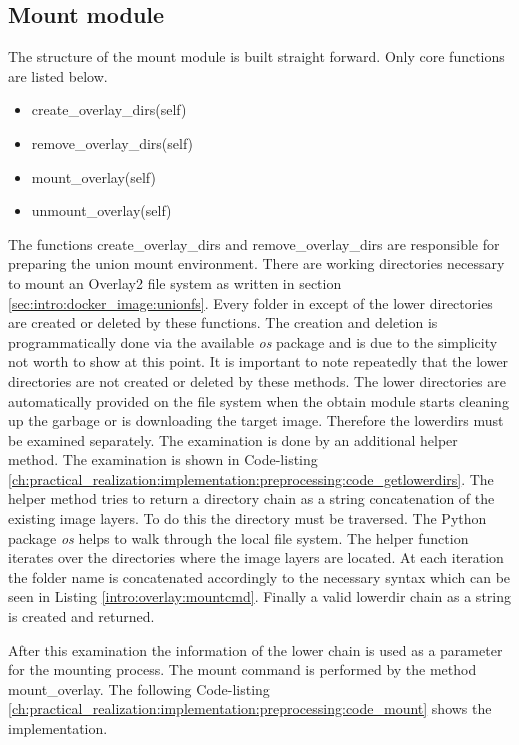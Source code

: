 \subsection{Mount module}	
\label{ch:practical_realization:implementation:mount}
The structure of the mount module is built straight forward. Only core functions are listed below.
\begin{itemize}
\item create\_overlay\_dirs(self)
\item remove\_overlay\_dirs(self)
\item mount\_overlay(self)
\item unmount\_overlay(self)
\end{itemize}
The functions create\_overlay\_dirs and remove\_overlay\_dirs are responsible for preparing the union mount environment. 
There are working directories necessary to mount an Overlay2 file system as written in section \ref{sec:intro:docker_image:unionfs}.
Every folder in except of the lower directories are created or deleted by these functions. 
The creation and deletion is programmatically done via the available \textit{os} package and is due to the simplicity not worth to show at this point. 
It is important to note repeatedly that the lower directories are not created or deleted by these methods. 
The lower directories are automatically provided on the file system when the obtain module starts cleaning up the garbage or is downloading the target image.
Therefore the lowerdirs must be examined separately. The examination is done by an additional helper method. 
The examination is shown in Code-listing \ref{ch:practical_realization:implementation:preprocessing:code_getlowerdirs}.
The helper method tries to return a directory chain as a string concatenation of the existing image layers.
To do this the directory must be traversed. 
The Python package \textit{os} helps to walk through the local file system. 
The helper function iterates over the directories where the image layers are located.
At each iteration the folder name is concatenated accordingly to the necessary syntax which can be seen in Listing \ref{intro:overlay:mountcmd}. 
Finally a valid lowerdir chain as a string is created and returned.

After this examination the information of the lower chain is used as a parameter for the mounting process.
The mount command is performed by the method  mount\_overlay. The following Code-listing \ref{ch:practical_realization:implementation:preprocessing:code_mount} shows the implementation.

